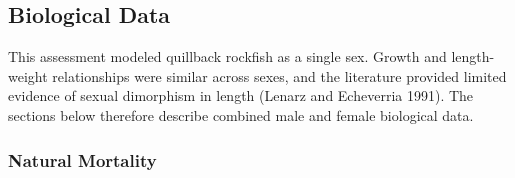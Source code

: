 \documentclass[11pt,
  english,
  letterpaper,
]{article}
\begin{document}
\leavevmode\tagmcend\tagstructend\par


\hypertarget{biological-data}{%
\subsection{Biological Data}\label{biological-data}}

\leavevmode\tagmcend\tagstructend


This assessment modeled quillback rockfish as a single sex. Growth and length-weight relationships were similar across sexes, and the literature provided limited evidence of sexual dimorphism in length {(Lenarz and Echeverria 1991)\leavevmode\tagmcend\tagstructend}. The sections below therefore describe combined male and female biological data.

\leavevmode\tagmcend\tagstructend\par


\hypertarget{natural-mortality}{%
\subsubsection{Natural Mortality}\label{natural-mortality}}

\leavevmode\tagmcend\tagstructend

\end{document}
